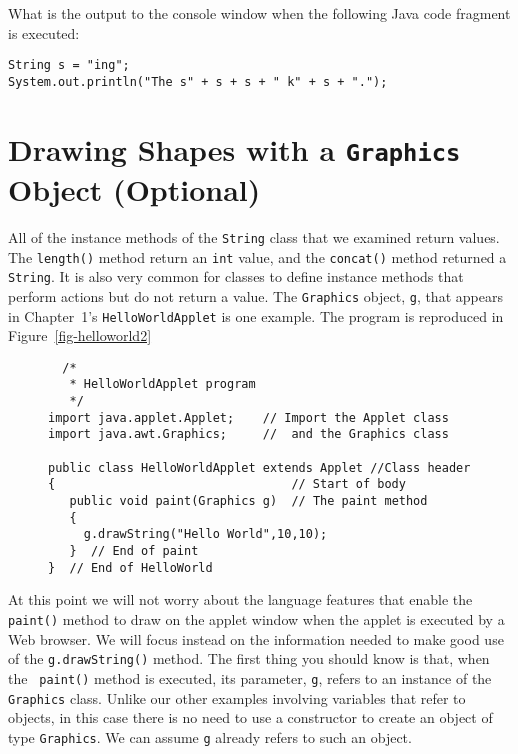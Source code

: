 
\begin{SSTUDY}

\item
What is the output to the console window when the following
Java code fragment is executed:

\begin{jjjlisting}
\begin{lstlisting}
String s = "ing";
System.out.println("The s" + s + s + " k" + s + ".");
\end{lstlisting}
\end{jjjlisting}

\end{SSTUDY}


\section{Drawing Shapes with a {\tt Graphics} Object (Optional)}

All of the instance methods of the {\tt String} class that we examined
return values. The {\tt length()} method return an {\tt int} value,
and the {\tt concat()} method returned a {\tt String}.  It is also
very common for classes to define instance methods that perform
actions but do not return a value. The {\tt Graphics} object, {\tt g},
that appears in Chapter~1's {\tt HelloWorldApplet} is one
example. The program is reproduced in Figure~\ref{fig-helloworld2}
\begin{figure}[h!]
\jjjprogstart
\begin{jjjlisting}
\begin{lstlisting}
  /*
   * HelloWorldApplet program
   */
import java.applet.Applet;    // Import the Applet class
import java.awt.Graphics;     //  and the Graphics class

public class HelloWorldApplet extends Applet //Class header
{                                 // Start of body
   public void paint(Graphics g)  // The paint method
   {
     g.drawString("Hello World",10,10);
   }  // End of paint
}  // End of HelloWorld
\end{lstlisting}
\end{jjjlisting}
\end{figure}

At this point we will not worry about the language features that
enable the {\tt paint()} method to draw on the applet window when the
applet is executed by a Web browser.  We will focus instead on the
information needed to make good use of the {\tt g.drawString()}
method.  The first thing you should know is that, when the {\tt
paint()} method is executed, its parameter, {\tt g}, refers to an
instance of the {\tt Graphics} class. Unlike our other examples
involving variables that refer to objects, in this case there is no need to use a
constructor to create an object of type {\tt Graphics}. We can assume
{\tt g} already refers to such an object.

